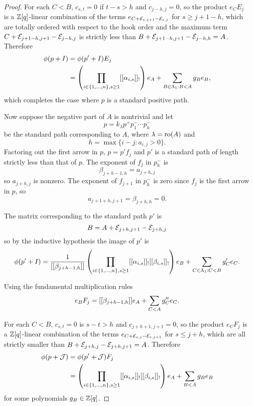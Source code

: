 \documentclass[a4paper, 11pt, twoside]{report}
\begin{document}
\begin{proof}
For each $C<B$, $c_{s,t}=0$ if $t-s>h$ and $c_{j-h,j}=0$, so the product $e_CE_j$ is a $\mathbb{Z}[q]$-linear combination of the terms $e_{C+\mathcal{E}_{s,j+1}-\mathcal{E}_{s,j}}$ for $s\geq j+1-h$, which are totally ordered with respect to the hook order and the maximum term $C+\mathcal{E}_{j+1-h,j+1}-\mathcal{E}_{j-h,j}$ is strictly less than $B+\mathcal{E}_{j+1-h,j+1}-\mathcal{E}_{j-h,h}=A$. Therefore
\begin{align*}
\phi(p+I)
&= \phi(p'+I)E_j\\
&= \left(\prod_{i\in\{1,\ldots,n\},s\geq 1} [[\alpha_{i,s}]]_!\right)e_A + \sum_{B\in\Lambda_1{}:B<A} g_Be_B,
\end{align*}
which completes the case where $p$ is a standard positive path.

Now suppose the negative part of $A$ is nontrivial and let
\begin{equation*}
p = k_\lambda p^+ p_1^-\cdots p_h^-
\end{equation*}
be the standard path corresponding to $A$, where $\lambda=\operatorname{ro}(A)$ and
\begin{equation*}
h = \max\{i-j:a_{i,j}>0\}.
\end{equation*}
Factoring out the first arrow in $p$, $p=p'f_j$ and $p'$ is a standard path of length strictly less than that of $p$. The exponent of $f_j$ in $p_h^-$ is \begin{equation*}
\beta_{j+h-1,h} = a_{j+h,j}
\end{equation*}
so $a_{j+h,j}$ is nonzero. The exponent of $f_{j+1}$ in $p_h^-$ is zero since $f_j$ is the first arrow in $p$, so
\begin{equation*}
a_{j+1+h,j+1}=\beta_{j+h,h}=0.
\end{equation*}

The matrix corresponding to the standard path $p'$ is
\begin{equation*}
B=A+\mathcal{E}_{j+h,j+1}-\mathcal{E}_{j+h,j}
\end{equation*}
so by the inductive hypothesis the image of $p'$ is
\begin{equation*}
\phi(p'+I) = \frac{1}{[[\beta_{j+h-1,h}]]}\left(\prod_{i\in\{1,\ldots,n\},s\geq 1} [[\alpha_{i,s}]]_![[\beta_{i,s}]]_!\right)e_B + \sum_{C\in\Lambda_1{}:C<B} g_C'e_C.
\end{equation*}

Using the fundamental multiplication rules
\begin{equation*}
e_BF_j = [[\beta_{j+h-1,h}]]e_A + \sum_{C<A} g_C''e_C.
\end{equation*}

For each $C<B$, $c_{s,t}=0$ is $s-t>h$ and $c_{j+h+1,j+1}=0$, so the product $e_CF_j$ is a $\mathbb{Z}[q]$-linear combination of the terms $e_{C+\mathcal{E}_{s,j}-\mathcal{E}_{s,j+1}}$ for $s\le j+h$, which are all strictly smaller than $B+\mathcal{E}_{j+h,j}-\mathcal{E}_{j+h,j+1}=A$. Therefore
\begin{align*}
\phi(p+\mathcal{J})
&= \phi(p'+\mathcal{J})F_j\\
&= \left(\prod_{i\in\{1,\ldots,n\},s\geq 1} [[\alpha_{i,s}]]_![[\beta_{i,s}]]_!\right)e_A + \sum_{B<A} g_Be_B
\end{align*}
for some polynomials $g_B\in\mathbb{Z}[q]$.
\end{proof}
\end{document}
